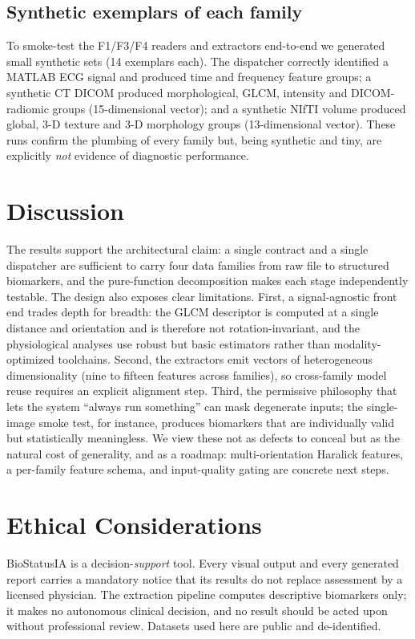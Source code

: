 \documentclass[10pt,twocolumn]{article}
\begin{document}
\subsection{Synthetic exemplars of each family}
To smoke-test the F1/F3/F4 readers and extractors end-to-end we generated small
synthetic sets (14 exemplars each). The dispatcher correctly identified a
MATLAB ECG signal and produced time and frequency feature groups; a synthetic CT
DICOM produced morphological, GLCM, intensity and DICOM-radiomic groups
(15-dimensional vector); and a synthetic NIfTI volume produced global, 3-D
texture and 3-D morphology groups (13-dimensional vector). These runs confirm
the plumbing of every family but, being synthetic and tiny, are explicitly
\emph{not} evidence of diagnostic performance.

\section{Discussion}
The results support the architectural claim: a single contract and a single
dispatcher are sufficient to carry four data families from raw file to
structured biomarkers, and the pure-function decomposition makes each stage
independently testable. The design also exposes clear limitations. First, a
signal-agnostic front end trades depth for breadth: the GLCM descriptor is
computed at a single distance and orientation and is therefore not
rotation-invariant, and the physiological analyses use robust but basic
estimators rather than modality-optimized toolchains. Second, the extractors
emit vectors of heterogeneous dimensionality (nine to fifteen features across
families), so cross-family model reuse requires an explicit alignment step.
Third, the permissive philosophy that lets the system ``always run something''
can mask degenerate inputs; the single-image smoke test, for instance, produces
biomarkers that are individually valid but statistically meaningless. We view
these not as defects to conceal but as the natural cost of generality, and as a
roadmap: multi-orientation Haralick features, a per-family feature schema, and
input-quality gating are concrete next steps.

\section{Ethical Considerations}
BioStatusIA is a decision-\emph{support} tool. Every visual output and every
generated report carries a mandatory notice that its results do not replace
assessment by a licensed physician. The extraction pipeline computes descriptive
biomarkers only; it makes no autonomous clinical decision, and no result should
be acted upon without professional review. Datasets used here are public and
de-identified.
\end{document}
